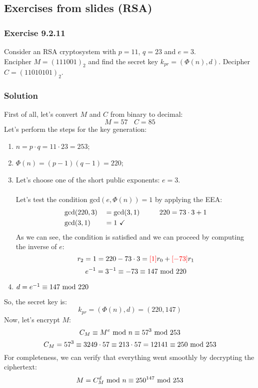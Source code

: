 \newpage
\subsection{Exercises from slides (RSA)}
\subsubsection{Exercise 9.2.11}
Consider an RSA cryptosystem with $p=11$, $q=23$ and $e=3$.\\Encipher $M=(111001)_2$ and find the secret key $k_{pr}=(\Phi(n),d)$. Decipher $C=(11010101)_2$.

\subsubsection*{Solution}
First of all, let's convert $M$ and $C$ from binary to decimal:
$$M=57\ \ \ \ C=85$$
Let's perform the steps for the key generation:
\begin{enumerate}
    \item $n=p\cdot q=11\cdot23=253$;
    \item $\Phi(n)=(p-1)(q-1)=220$;
    \item Let's choose one of the short public exponents: $e=3$.\\\\
    Let's test the condition $\text{gcd}(e,\Phi(n))=1$ by applying the EEA:
    \begin{alignat*}{2}
        &\text{gcd}(220,3)&&=\text{gcd}(3,1)\hspace{1cm}220=73\cdot3+1\\
        &\text{gcd}(3,1)&&=1\text{ \checkmark}
    \end{alignat*}
    As we can see, the condition is satisfied and we can proceed by computing the inverse of $e$:
    $$r_2=1=220-73\cdot3=\textcolor{red}{[1]}r_0+\textcolor{red}{[-73]}r_1$$
    $$e^{-1}=3^{-1}\equiv-73\equiv147\text{ mod }220$$
    \item $d= e^{-1}\equiv147\text{ mod }220$
\end{enumerate}
So, the secret key is:
$$k_{pr}=(\Phi(n), d)=(220,147)$$
Now, let's encrypt $M$:
$$C_M\equiv M^e\text{ mod } n\equiv57^3\text{ mod }253$$
$$C_M=57^3\equiv3249\cdot57\equiv213\cdot57=12141\equiv250\text{ mod }253$$
For completeness, we can verify that everything went smoothly by decrypting the ciphertext:
$$M=C_M^d\text{ mod } n\equiv250^{147}\text{ mod }253$$
